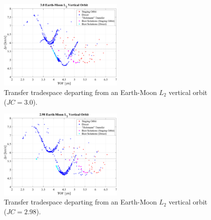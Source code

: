 \begin{figure}[ht]
    \centering
    \includegraphics[width=0.55\textwidth]{figures/TradeSpace_L2Vertical_3_00.pdf}
    \caption{Transfer tradespace departing from an Earth-Moon $L_{2}$ vertical orbit ($JC=3.0$).}
\end{figure}
\clearpage

\begin{figure}[ht]
    \centering
    \includegraphics[width=0.55\textwidth]{figures/TradeSpace_L2Vertical_2_98.pdf}
    \caption{Transfer tradespace departing from an Earth-Moon $L_{2}$ vertical orbit ($JC=2.98$).}
\end{figure}
\clearpage
